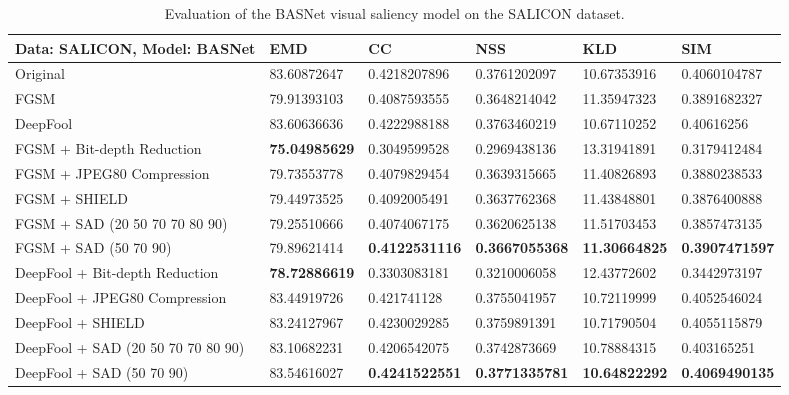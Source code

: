 \documentclass[10pt,twocolumn,letterpaper]{article}
\begin{document}
\begin{table*}[hbt]
\begin{tabular}{l|l|l|l|l|l}
Data: \textbf{SALICON}, Model: \textbf{BASNet}                         & EMD         & CC           & NSS         & KLD         & SIM  \\
\hline
Original                        & 83.60872647 & 0.4218207896 & 0.3761202097 & 10.67353916 & 0.4060104787 \\
\hline
FGSM                           & 79.91393103 & 0.4087593555 & 0.3648214042 & 11.35947323 & 0.3891682327 \\
DeepFool                       & 83.60636636 & 0.4222988188 & 0.3763460219 & 10.67110252 & 0.40616256   \\
\hline
FGSM + Bit-depth Reduction     & \textbf{75.04985629} & 0.3049599528 & 0.2969438136 & 13.31941891 & 0.3179412484 \\
FGSM + JPEG80 Compression      & 79.73553778 & 0.4079829454 & 0.3639315665 & 11.40826893 & 0.3880238533 \\
FGSM + SHIELD                  & 79.44973525 & 0.4092005491 & 0.3637762368 & 11.43848801 & 0.3876400888 \\
FGSM + SAD (20 50 70 70 80 90)            & 79.25510666 & 0.4074067175 & 0.3620625138 & 11.51703453 & 0.3857473135 \\
FGSM + SAD (50 70 90)            & 79.89621414 & \textbf{0.4122531116} & \textbf{0.3667055368} & \textbf{11.30664825} & \textbf{0.3907471597} \\
\hline
DeepFool + Bit-depth Reduction & \textbf{78.72886619} & 0.3303083181 & 0.3210006058 & 12.43772602 & 0.3442973197 \\
DeepFool + JPEG80 Compression  & 83.44919726 & 0.421741128  & 0.3755041957 & 10.72119999 & 0.4052546024 \\
DeepFool + SHIELD              & 83.24127967 & 0.4230029285 & 0.3759891391 & 10.71790504 & 0.4055115879 \\
DeepFool + SAD (20 50 70 70 80 90)        & 83.10682231 & 0.4206542075 & 0.3742873669 & 10.78884315 & 0.403165251  \\
DeepFool + SAD (50 70 90)        & 83.54616027  & \textbf{0.4241522551} & \textbf{0.3771335781} & \textbf{10.64822292} & \textbf{0.4069490135}
\end{tabular}
  \caption{Evaluation of the BASNet\cite{BASNet} visual saliency model\cite{BASNet} on the SALICON\cite{jiang2015salicon} dataset.}
  \label{table:results_salicon_basnet}
\end{table*}
\end{document}
